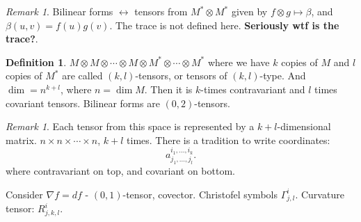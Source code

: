 \documentclass[12pt]{amsbook}
\theoremstyle{plain}
\numberwithin{section}{chapter}
\numberwithin{equation}{chapter}
\theoremstyle{definition}
\newtheorem{Def}[theorem]{Definition}
\theoremstyle{remark}
\newtheorem{rem}[theorem]{Remark}
\newcommand{\tens}{\otimes}
\begin{document}
\begin{rem}
Bilinear forms $\leftrightarrow$ tensors from $M^* \tens M^*$ given by $f \tens g \mapsto \beta$, and $\beta(u,v) = f(u) g(v)$. The trace is not defined here. \textbf{Seriously wtf is the trace?}. 
\end{rem}

\begin{Def}
$M \tens M \tens \cdots \tens M \tens M^* \tens \cdots \tens M^*$ where we have $k$ copies of $M$ and $l$ copies of $M^*$ are called $(k,l)$-tensors, or tensors of $(k,l)$-type. And $\dim = n^{k + l}$, where $n = \dim M$. Then it is $k$-times contravariant and $l$ times covariant tensors. Bilinear forms are $(0,2)$-tensors. 
\end{Def}

\begin{rem}
Each tensor from this space is represented by a $k + l$-dimensional matrix. $n \times n \times \cdots \times n$, $k + l$ times. There is a tradition to write coordinates: $$
a_{j_1,...,j_l}^{i_1,...,i_k}.
$$
where contravariant on top, and covariant on bottom. 
\end{rem}

Consider $\nabla f = df$ - $(0,1)$-tensor, covector. Christofel symbols $\Gamma_{j,l}^i$. Curvature tensor: $R_{j,k,l}^i$. 

















\backmatter


\printindex
\end{document}
